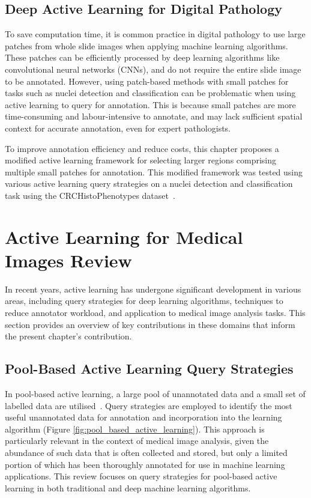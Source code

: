 \subsection{Deep Active Learning for Digital Pathology}
\label{subsec:active_deep_learning}
To save computation time, it is common practice in digital pathology to use large patches from whole slide images when applying machine learning algorithms. These patches can be efficiently processed by deep learning algorithms like convolutional neural networks (CNNs), and do not require the entire slide image to be annotated. However, using patch-based methods with small patches for tasks such as nuclei detection and classification can be problematic when using active learning to query for annotation. This is because small patches are more time-consuming and labour-intensive to annotate, and may lack sufficient spatial context for accurate annotation, even for expert pathologists.

To improve annotation efficiency and reduce costs, this chapter proposes a modified active learning framework for selecting larger regions comprising multiple small patches for annotation. This modified framework was tested using various active learning query strategies on a nuclei detection and classification task using the CRCHistoPhenotypes dataset~\citep{sirinukunwattana2016locality}.



\section{Active Learning for Medical Images Review}
\label{sec:active_review}
In recent years, active learning has undergone significant development in various areas, including query strategies for deep learning algorithms, techniques to reduce annotator workload, and application to medical image analysis tasks. This section provides an overview of key contributions in these domains that inform the present chapter's contribution.

\subsection{Pool-Based Active Learning Query Strategies}
\label{subsec:active_pool_based}
In pool-based active learning, a large pool of unannotated data and a small set of labelled data are utilised~\citep{settles2012active}. Query strategies are employed to identify the most useful unannotated data for annotation and incorporation into the learning algorithm (Figure \ref{fig:pool_based_active_learning}). This approach is particularly relevant in the context of medical image analysis, given the abundance of such data that is often collected and stored, but only a limited portion of which has been thoroughly annotated for use in machine learning applications. This review focuses on query strategies for pool-based active learning in both traditional and deep machine learning algorithms.

